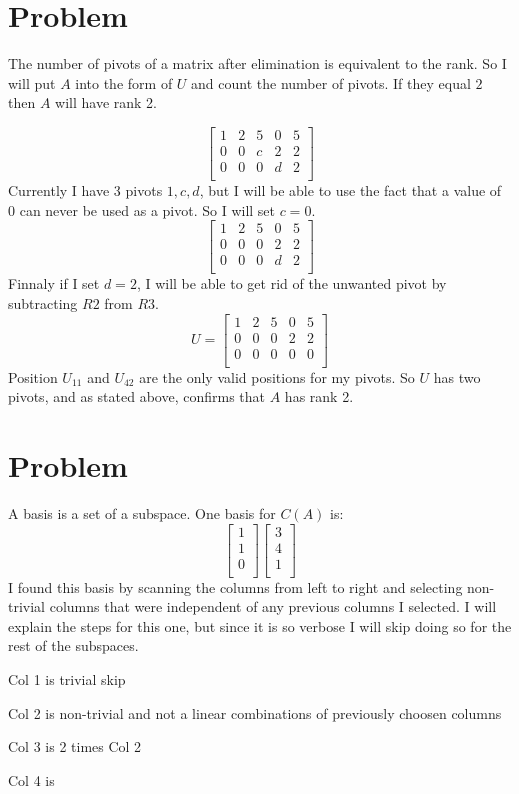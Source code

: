 \documentclass{article}
\begin{document}
\section{Problem}
The number of pivots of a matrix after elimination is equivalent to the rank. So I will put $A$ into the form of $U$ and count the number of pivots. If they equal $2$ then $A$ will have rank 2.

\[
\begin{bmatrix}
1 & 2 & 5 & 0 & 5 \\
0 & 0 & c & 2 & 2 \\
0 & 0 & 0 & d & 2 \\
\end{bmatrix}
\]
Currently I have 3 pivots $1, c, d$, but I will be able to use the fact that a value of $0$ can never be used as a pivot. So I will set $c = 0$.
\[
\begin{bmatrix}
1 & 2 & 5 & 0 & 5 \\
0 & 0 & 0 & 2 & 2 \\
0 & 0 & 0 & d & 2 \\
\end{bmatrix}
\]
Finnaly if I set $d = 2$, I will be able to get rid of the unwanted pivot by subtracting $R2$ from $R3$.
\[
U =
\begin{bmatrix}
1 & 2 & 5 & 0 & 5 \\
0 & 0 & 0 & 2 & 2 \\
0 & 0 & 0 & 0 & 0 \\
\end{bmatrix}
\]
Position $U_{11}$ and $U_{42}$ are the only valid positions for my pivots. So $U$ has two pivots, and as stated above, confirms that $A$ has rank 2.
\section{Problem}
A basis is a set of a subspace. One basis for $C(A)$ is:
\[
\begin{bmatrix}
1 \\
1 \\
0 \\
\end{bmatrix}
\begin{bmatrix}
3 \\
4 \\
1 \\
\end{bmatrix}
\]
I found this basis by scanning the columns from left to right and selecting non-trivial columns that were independent of any previous columns I selected. I will explain the steps for this one, but since it is so verbose I will skip doing so for the rest of the subspaces. 

Col 1 is trivial skip

Col 2 is non-trivial and not a linear combinations of previously choosen columns

Col 3 is 2 times Col 2

Col 4 is
\end{document}
